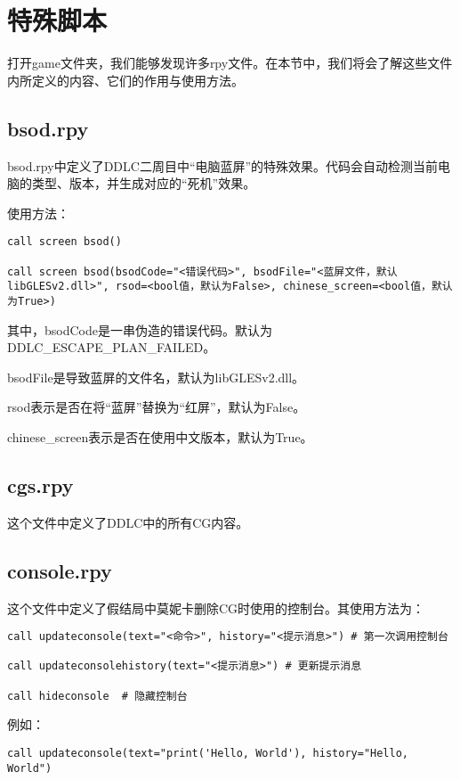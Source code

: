 \section{特殊脚本}

打开game文件夹，我们能够发现许多rpy文件。在本节中，我们将会了解这些文件内所定义的内容、它们的作用与使用方法。

\subsection{bsod.rpy}

bsod.rpy中定义了DDLC二周目中“电脑蓝屏”的特殊效果。代码会自动检测当前电脑的类型、版本，并生成对应的“死机”效果。

使用方法：
\begin{lstlisting}
call screen bsod()

call screen bsod(bsodCode="<错误代码>", bsodFile="<蓝屏文件，默认libGLESv2.dll>", rsod=<bool值，默认为False>, chinese_screen=<bool值，默认为True>)
\end{lstlisting}

其中，bsodCode是一串伪造的错误代码。默认为DDLC\_ESCAPE\_PLAN\_FAILED。


bsodFile是导致蓝屏的文件名，默认为libGLESv2.dll。


rsod表示是否在将“蓝屏”替换为“红屏”，默认为False。


chinese\_screen表示是否在使用中文版本，默认为True。


\subsection{cgs.rpy}

这个文件中定义了DDLC中的所有CG内容。


\subsection{console.rpy}

这个文件中定义了假结局中莫妮卡删除CG时使用的控制台。其使用方法为：
\begin{lstlisting}
call updateconsole(text="<命令>", history="<提示消息>") # 第一次调用控制台

call updateconsolehistory(text="<提示消息>") # 更新提示消息

call hideconsole  # 隐藏控制台
\end{lstlisting}

例如：
\begin{lstlisting}
call updateconsole(text="print('Hello, World'), history="Hello, World")
\end{lstlisting}

